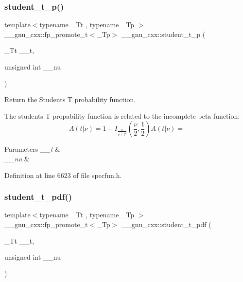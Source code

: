\subsubsection{\texorpdfstring{student\+\_\+t\+\_\+p()}{student\_t\_p()}}
{\footnotesize\ttfamily template$<$typename \+\_\+\+Tt , typename \+\_\+\+Tp $>$ \\
\+\_\+\+\_\+gnu\+\_\+cxx\+::fp\+\_\+promote\+\_\+t$<$\+\_\+\+Tp$>$ \+\_\+\+\_\+gnu\+\_\+cxx\+::student\+\_\+t\+\_\+p (\begin{DoxyParamCaption}\item[{\+\_\+\+Tt}]{\+\_\+\+\_\+t,  }\item[{unsigned int}]{\+\_\+\+\_\+nu }\end{DoxyParamCaption})}



Return the Students T probability function. 

The students T propability function is related to the incomplete beta function\+: \[ A(t|\nu) = 1 - I_{\frac{\nu}{\nu + t^2}}(\frac{\nu}{2}, \frac{1}{2}) A(t|\nu) = \]


\begin{DoxyParams}{Parameters}
{\em \+\_\+\+\_\+t} & \\
\hline
{\em \+\_\+\+\_\+nu} & \\
\hline
\end{DoxyParams}


Definition at line 6623 of file specfun.\+h.

\mbox{\label{group__gnu__math__spec__func_ga95a4c03cf0a8104e9a15a35acfe5fb3a}} 
\subsubsection{\texorpdfstring{student\+\_\+t\+\_\+pdf()}{student\_t\_pdf()}}
{\footnotesize\ttfamily template$<$typename \+\_\+\+Tt , typename \+\_\+\+Tp $>$ \\
\+\_\+\+\_\+gnu\+\_\+cxx\+::fp\+\_\+promote\+\_\+t$<$\+\_\+\+Tp$>$ \+\_\+\+\_\+gnu\+\_\+cxx\+::student\+\_\+t\+\_\+pdf (\begin{DoxyParamCaption}\item[{\+\_\+\+Tt}]{\+\_\+\+\_\+t,  }\item[{unsigned int}]{\+\_\+\+\_\+nu }\end{DoxyParamCaption})}



